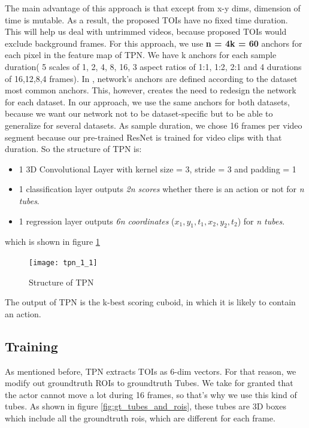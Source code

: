 The main advantage of this approach is that except from x-y dims, dimension of time is mutable. As a result, the proposed TOIs have
no fixed time duration. This will help us deal with untrimmed videos, because proposed TOIs would exclude background frames.
For this approach, we use \textbf{n = 4k = 60} anchors for each pixel in the feature map of TPN. We have k anchors for each sample
duration( 5 scales of 1, 2, 4, 8, 16, 3 aspect ratios of 1:1, 1:2, 2:1 and 4 durations of 16,12,8,4 frames).
In \cite{DBLP:journals/corr/HouCS17},  network's anchors are defined according to the dataset most common anchors. This, however,
creates the need to redesign the network for each dataset. In our approach, we use the same anchors for both datasets, because we want our network not
to be dataset-specific but to be able to generalize for several datasets. As sample duration, we chose 16 frames per video segment because
our pre-trained ResNet is trained for video clips with that duration.
So the structure of TPN is:
\begin{itemize}
\item 1 3D Convolutional Layer with kernel size = 3, stride = 3 and padding = 1
\item 1 classification layer outputs \textit{2n scores} whether there is an action or not for \textit{n tubes}.
\item 1 regression layer outputs \textit{6n coordinates} ($x_1,y_1,t_1,x_2,y_2,t_2$) for \textit{n tubes}.
\end{itemize}

which is shown in figure \ref{fig:tpn_1_1}
\begin{figure}[h]

  \texttt{[image: tpn\_1\_1]}
  \caption{Structure of TPN}
  \label{fig:tpn_1_1}
\end{figure}

The output of TPN is the k-best scoring cuboid, in which it is likely to contain an action.


\subsection{Training}
As mentioned before, TPN extracts TOIs as 6-dim vectors. For that reason, we modify out groundtruth ROIs to groundtruth Tubes.
We take for granted that the actor cannot move a lot during 16 frames, so that's why we use this kind of tubes. As shown 
in figure \ref{fig:gt_tubes_and_rois}, these tubes are 3D boxes which include all the groundtruth rois, which are different
for each frame.

